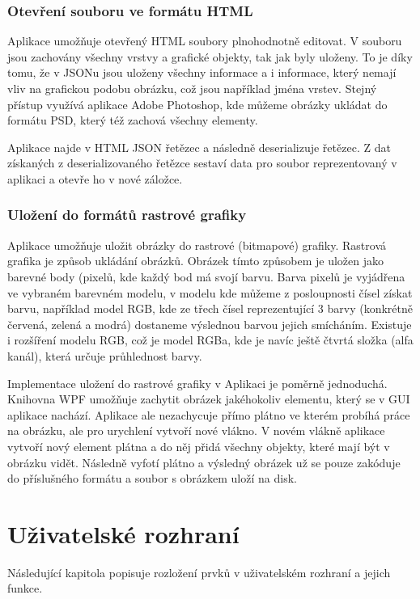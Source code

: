 \documentclass[
  field=inf,
  biblatex,
  glossaries,
  index
]{kidiplom}
\begin{document}
\subsubsection{Otevření souboru ve formátu HTML}
Aplikace umožňuje otevřený HTML soubory plnohodnotně editovat. V souboru jsou zachovány všechny vrstvy a grafické objekty, tak jak byly uloženy. To je díky tomu, že v JSONu jsou uloženy všechny informace a i informace, který nemají vliv na grafickou podobu obrázku, což jsou například jména vrstev. Stejný přístup využívá aplikace Adobe Photoshop, kde můžeme obrázky ukládat do formátu PSD, který též zachová všechny elementy.

Aplikace najde v HTML JSON řetězec a následně deserializuje řetězec. Z dat získaných z deserializovaného řetězce sestaví data pro soubor reprezentovaný v aplikaci a otevře ho v nové záložce.

\subsubsection{Uložení do formátů rastrové grafiky}
Aplikace umožňuje uložit obrázky do rastrové (bitmapové) grafiky. Rastrová grafika je způsob ukládání obrázků. Obrázek tímto způsobem je uložen jako barevné body (pixelů, kde každý bod má svojí barvu. Barva pixelů je vyjádřena ve vybraném barevném modelu, v modelu kde můžeme z posloupnosti čísel získat barvu, například model RGB, kde ze třech čísel reprezentující 3 barvy (konkrétně červená, zelená a modrá) dostaneme výslednou barvou jejich smícháním. Existuje i rozšíření modelu RGB, což je model RGBa, kde je navíc ještě čtvrtá složka (alfa kanál), která určuje průhlednost barvy.

Implementace uložení do rastrové grafiky v Aplikaci je poměrně jednoduchá. Knihovna WPF umožňuje zachytit obrázek jakéhokoliv elementu, který se v GUI aplikace nachází. Aplikace ale nezachycuje přímo plátno ve kterém probíhá práce na obrázku, ale pro urychlení vytvoří nové vlákno. V novém vlákně aplikace vytvoří nový element plátna a do něj přidá všechny objekty, které mají být v obrázku vidět. Následně vyfotí plátno a výsledný obrázek už se pouze zakóduje do příslušného formátu a soubor s obrázkem uloží na disk.


\section{Uživatelské rozhraní}

Následující kapitola popisuje rozložení prvků v uživatelském rozhraní a jejich funkce.
\end{document}
